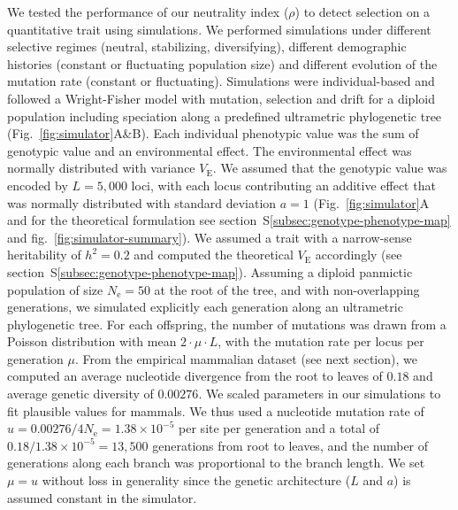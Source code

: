 \documentclass{article}
\newcommand{\Multiply}{\cdot}
\newcommand{\Ne}{N_{\text{e}}}
\newcommand{\Heritability}{h^2}
\newcommand{\MutationRatePheno}{\mu}
\newcommand{\MutationRateNuc}{u}
\newcommand{\NbrLoci}{L}
\newcommand{\VarEnv}{V_{\mathrm{E}}}
\newcommand{\NI}{\rho}
\begin{document}
We tested the performance of our neutrality index ($\NI$) to detect selection on a quantitative trait using simulations.
We performed simulations under different selective regimes (neutral, stabilizing, diversifying), different demographic histories (constant or fluctuating population size) and different evolution of the mutation rate (constant or fluctuating).
Simulations were individual-based and followed a Wright-Fisher model with mutation, selection and drift for a diploid population including speciation along a predefined ultrametric phylogenetic tree (Fig.~\ref{fig:simulator}A\&B).
Each individual phenotypic value was the sum of genotypic value and an environmental effect.
The environmental effect was normally distributed with variance $\VarEnv$.
We assumed that the genotypic value was encoded by $\NbrLoci=5,000$ loci, with each locus contributing an additive effect that was normally distributed with standard deviation $a=1$ (Fig.~\ref{fig:simulator}A and for the theoretical formulation see section~S\ref{subsec:genotype-phenotype-map} and fig.~\ref{fig:simulator-summary}).
We assumed a trait with a narrow-sense heritability of $\Heritability=0.2$ and computed the theoretical $\VarEnv$ accordingly (see section~S\ref{subsec:genotype-phenotype-map}).
Assuming a diploid panmictic population of size $\Ne=50$ at the root of the tree, and with non-overlapping generations, we simulated explicitly each generation along an ultrametric phylogenetic tree.
For each offspring, the number of mutations was drawn from a Poisson distribution with mean $2 \Multiply \MutationRatePheno \Multiply \NbrLoci $, with the mutation rate per locus per generation $\MutationRatePheno$.
From the empirical mammalian dataset (see next section), we computed an average nucleotide divergence from the root to leaves of $0.18$ and average genetic diversity of $0.00276$.
We scaled parameters in our simulations to fit plausible values for mammals.
We thus used a nucleotide mutation rate of $\MutationRateNuc=0.00276 / 4 \Ne = 1.38 \times 10^{-5}$ per site per generation  and a total of $0.18 / 1.38 \times 10^{-5} = 13,500$ generations from root to leaves, and the number of generations along each branch was proportional to the branch length.
We set $\MutationRatePheno=\MutationRateNuc$ without loss in generality since the genetic architecture ($\NbrLoci$ and $a$) is assumed constant in the simulator.
\end{document}

